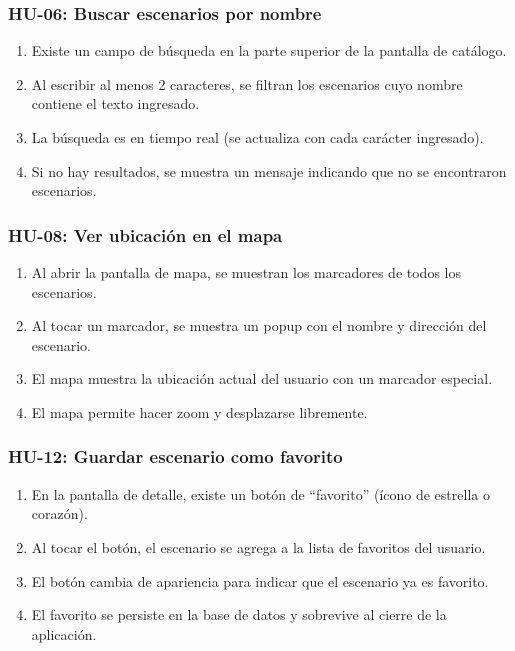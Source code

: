 \subsubsection{HU-06: Buscar escenarios por nombre}

\begin{enumerate}
  \item Existe un campo de búsqueda en la parte superior de la pantalla de
    catálogo.
  \item Al escribir al menos 2 caracteres, se filtran los escenarios cuyo
    nombre contiene el texto ingresado.
  \item La búsqueda es en tiempo real (se actualiza con cada carácter
    ingresado).
  \item Si no hay resultados, se muestra un mensaje indicando que no se
    encontraron escenarios.
\end{enumerate}

\subsubsection{HU-08: Ver ubicación en el mapa}

\begin{enumerate}
  \item Al abrir la pantalla de mapa, se muestran los marcadores de todos
    los escenarios.
  \item Al tocar un marcador, se muestra un popup con el nombre y dirección
    del escenario.
  \item El mapa muestra la ubicación actual del usuario con un marcador
    especial.
  \item El mapa permite hacer zoom y desplazarse libremente.
\end{enumerate}

\subsubsection{HU-12: Guardar escenario como favorito}

\begin{enumerate}
  \item En la pantalla de detalle, existe un botón de ``favorito'' (ícono
    de estrella o corazón).
  \item Al tocar el botón, el escenario se agrega a la lista de favoritos
    del usuario.
  \item El botón cambia de apariencia para indicar que el escenario ya es
    favorito.
  \item El favorito se persiste en la base de datos y sobrevive al cierre
    de la aplicación.
\end{enumerate}
